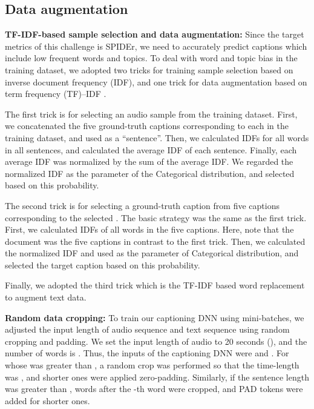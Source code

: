 \documentclass{article}
\begin{document}
\begin{sloppy}
\subsection{Data augmentation}

\vspace{3pt}
\noindent
{\bf TF-IDF-based sample selection and data augmentation:} Since the target metrics of this challenge is SPIDEr, we need to accurately predict captions which include low frequent words and topics.  
To deal with word and topic bias in the training dataset, we adopted two tricks for training sample selection based on inverse document frequency (IDF), and one trick for data augmentation based on term frequency (TF)--IDF \cite{uda}.


The first trick is for selecting an audio sample  from the training dataset.
First, we concatenated the five ground-truth captions corresponding to each  in the training dataset, and used as a ``sentence''.
Then, we calculated IDFs for all words in all sentences, and calculated the average IDF of each sentence.
Finally, each average IDF was normalized by the sum of the average IDF. We regarded the normalized IDF as the parameter of the Categorical distribution, and selected  based on this probability.

The second trick is for selecting a ground-truth caption  from five captions corresponding to the selected .
The basic strategy was the same as the first trick.
First, we calculated IDFs of all words in the five captions. Here, note that the document was the five captions in contrast to the first trick.
Then, we calculated the normalized IDF and used as the parameter of Categorical distribution, and selected the target caption  based on this probability.


Finally, we adopted the third trick which is the TF-IDF based word replacement \cite{uda} to augment text data.


\vspace{3pt}
\noindent
{\bf Random data cropping:} 
To train our captioning DNN using mini-batches, we adjusted the input length of audio sequence and text sequence using random cropping and padding.
We set the input length of audio to 20 seconds (), and the number of words is .
Thus, the inputs of the captioning DNN were  and .
For  whose  was greater than , a random crop was performed so that the time-length was , and shorter ones were applied zero-padding.
Similarly, if the sentence length was greater than , words after the -th word were cropped, and PAD tokens were added for shorter ones.



\end{sloppy}
\end{document}

